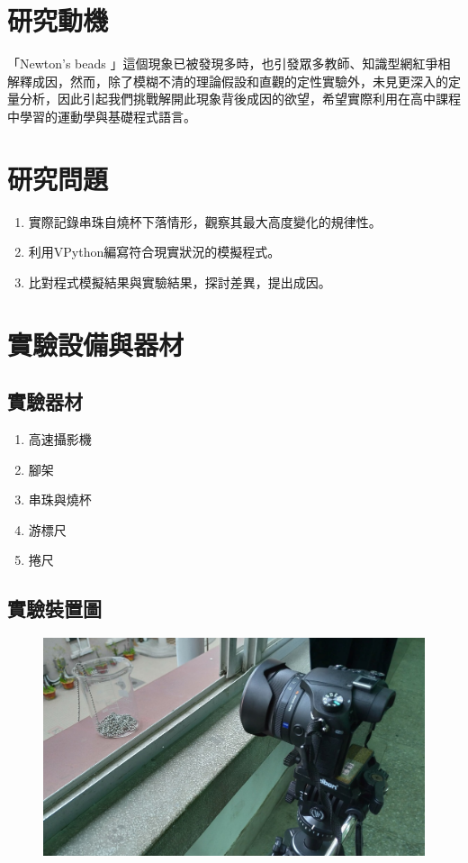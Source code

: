 \documentclass[11pt,twoside,b5paper]{article}
\begin{document}
\begin{titlepage}
    \section{研究動機}
    
    「Newton's beads \cite{Hooke}」這個現象已被發現多時，也引發眾多教師、知識型網紅爭相解釋成因，然而，除了模糊不清的理論假設和直觀的定性實驗外，未見更深入的定量分析，因此引起我們挑戰解開此現象背後成因的欲望，希望實際利用在高中課程中學習的運動學與基礎程式語言。
    
    \section{研究問題}
    
    \begin{enumerate}
        \item 實際記錄串珠自燒杯下落情形，觀察其最大高度變化的規律性。
        \item 利用VPython編寫符合現實狀況的模擬程式。
        \item 比對程式模擬結果與實驗結果，探討差異，提出成因。
    \end{enumerate}
    
    \section{實驗設備與器材}
    \subsection{實驗器材}
    \begin{enumerate}
        \item 高速攝影機
        \item 腳架
        \item 串珠與燒杯
        \item 游標尺
        \item 捲尺
    \end{enumerate}
    
    \subsection{實驗裝置圖}
    \begin{figure}[H]
        \centering
        \includegraphics[scale=0.75]{a.png}
    \end{figure}
\end{titlepage}
\end{document}
